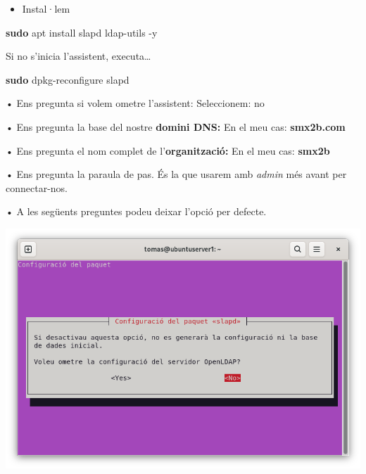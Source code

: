 \documentclass[
  12 pt,
  a4paper,
]{article}
\newenvironment{Shaded}{\begin{snugshade}}{\end{snugshade}}
\newcommand{\AttributeTok}[1]{\textcolor[rgb]{0.13,0.29,0.53}{#1}}
\newcommand{\FunctionTok}[1]{\textcolor[rgb]{0.13,0.29,0.53}{\textbf{#1}}}
\newcommand{\NormalTok}[1]{#1}
\providecommand{\tightlist}{%
  \setlength{\itemsep}{0pt}\setlength{\parskip}{0pt}}
\begin{document}
\begin{itemize}
\tightlist
\item
  Instal·lem
\end{itemize}

\begin{Shaded}
\begin{Highlighting}[]
\FunctionTok{sudo}\NormalTok{ apt install slapd ldap{-}utils }\AttributeTok{{-}y}
\end{Highlighting}
\end{Shaded}

Si no s'inicia l'assistent, executa\ldots{}

\begin{Shaded}
\begin{Highlighting}[]
\FunctionTok{sudo}\NormalTok{ dpkg{-}reconfigure slapd}
\end{Highlighting}
\end{Shaded}

• Ens pregunta si volem ometre l'assistent: Seleccionem: no

• Ens pregunta la base del nostre \textbf{domini DNS:} En el meu cas:
\textbf{smx2b.com}

• Ens pregunta el nom complet de l'\textbf{organització:} En el meu cas:
\textbf{smx2b}

• Ens pregunta la paraula de pas. És la que usarem amb \emph{admin} més
avant per connectar-nos.

• A les següents preguntes podeu deixar l'opció per defecte.

\includegraphics{png/ometreConfiguracio.png}
\end{document}
